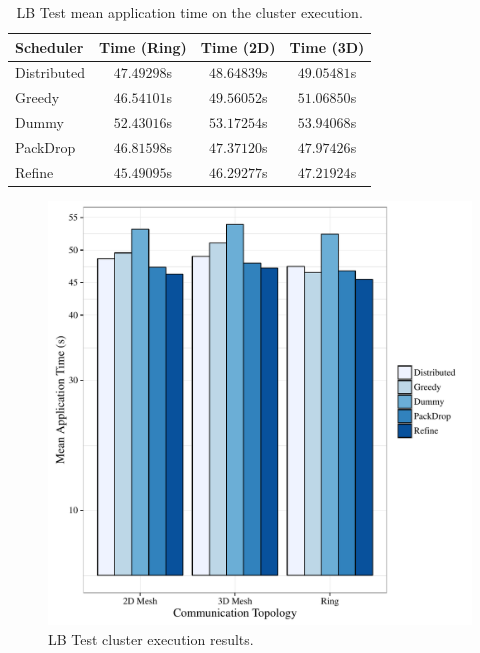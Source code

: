 \begin{table}[t]
	\centering
    \caption{LB Test mean application time on the cluster execution.}
	\begin{tabular}{l | c  c  c}
    	Scheduler & Time (Ring) & Time (2D) & Time (3D) \\ \hline
        Distributed & $47.49298$s & $48.64839$s & $49.05481$s \\
        Greedy & $46.54101$s & $49.56052$s & $51.06850$s \\
        Dummy & $52.43016$s & $53.17254$s & $53.94068$s \\
        PackDrop & $46.81598$s & $47.37120$s & $47.97426$s \\
        Refine & $45.49095$s & $46.29277$s & $47.21924$s \\		
	\end{tabular}
    \label{tab:lbtest:apptime}
\end{table}


\begin{figure}
	\centering
    \includegraphics[width=\linewidth]{images/apptime_lbtest_g5k.pdf}
    \caption{LB Test cluster execution results.}
    \label{fig:eval:g5k:lbtest:apptime}
\end{figure}

